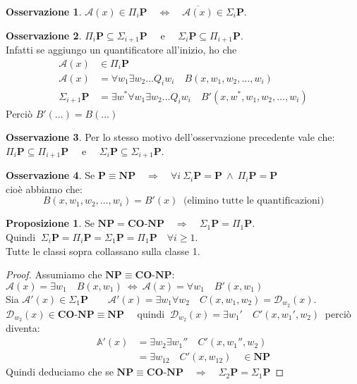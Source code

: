 \documentclass[a4paper]{article}
\theoremstyle{definition}
\newtheorem{prop}{Proposizione}[subsection]
\newtheorem{obs}{Osservazione}[subsection]
\newcommand{\p}{\mathbf{P}}
\newcommand{\np}{\mathbf{NP}}
\newcommand{\conp}{\mathbf{CO}\text{-}\mathbf{NP}}
\newcommand{\prob}[1]{\mathbb{#1}}
\newcommand{\alg}[1]{\mathcal{#1}}
\begin{document}
		\begin{obs}
			$ \alg{A}(x) \in \Pi_i \p \quad \Leftrightarrow \quad \overline{\alg{A}(x)} \in \Sigma_i \p $.
		\end{obs}
		
		\begin{obs}
			$ \Pi_i \p \subseteq \Sigma_{i+1} \p \quad $ e $ \quad \Sigma_i \p \subseteq \Pi_{i+1} \p $.  \\
			Infatti se aggiungo un quantificatore all'inizio, ho che
			\begin{align*}
				\alg{A}(x) &\in \Pi_i \p \\ 
				\alg{A}(x) &= \forall w_1 \exists w_2 \dots Q_i w_i \quad B(x, w_1, w_2, \dots, w_i) \\
				\Sigma_{i+1} \p &= \exists w^* \forall w_1 \exists w_2 \dots Q_i w_i \quad B'(x, w^*, w_1, w_2, \dots, w_i)
			\end{align*}
			Perciò $ B'(\dots) = B(\dots) $
		\end{obs}
		
		\begin{obs}
			Per lo stesso motivo dell'osservazione precedente vale che:\\
			$ \Pi_i \p \subseteq \Pi_{i+1} \p \quad $ e $ \quad \Sigma_i \p \subseteq \Sigma_{i+1} \p $.  
		\end{obs}
		
		\begin{obs}
			Se $ \p \equiv \np \quad \Rightarrow \quad \forall i \ \Sigma_i \p = \p \ \wedge \ \Pi_i \p = \p $ \\
			cioè abbiamo che:
			\[
				B(x, w_1, w_2, \dots, w_i) = B'(x) \ \text{ (elimino tutte le quantificazioni)}
			\]
		\end{obs}
		
		\begin{prop}
			Se $ \np = \conp \quad \Rightarrow \quad \Sigma_1 \p = \Pi_1 \p $.\\
			Quindi $ \ \Sigma_i \p = \Pi_i \p = \Sigma_1 \p = \Pi_1 \p \quad \forall i \geq 1 $.\\
			Tutte le classi sopra collassano sulla classe 1. 
		\end{prop}
		
		\begin{proof}
			Assumiamo che $ \np \equiv \conp $: \\
			$ \alg{A}(x) = \exists w_1 \quad B(x, w_1) \ \Leftrightarrow \ \alg{A}(x) = \forall w_1 \quad B'(x,w_1) $ \\
			Sia $ \alg{A}'(x) \in \Sigma_1 \p \qquad \alg{A}'(x) = \exists w_1 \forall w_2 \quad C(x, w_1, w_2) = \alg{D}_{w_2}(x) $. \\
			$ \alg{D}_{w_2}(x) \in \conp \equiv \np \quad $ quindi $ \ \alg{D}_{w_2}(x) = \exists w_1'\quad C'(x, w_1', w_2) \ $ perciò diventa:
			\begin{align*}
				\prob{A}'(x) &= \exists w_2 \exists w_1'' \quad C'(x, w_1'', w_2) \\
							 &= \exists w_{1 2} \quad C'(x, w_{1 2}) \quad \in \np
			\end{align*}
			Quindi deduciamo che se $ \np \equiv \conp \quad \Rightarrow \quad \Sigma_2 \p = \Sigma_1 \p $
		\end{proof}
		
\end{document}
